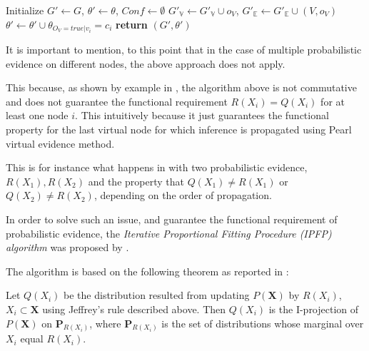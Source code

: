 \documentclass[11pt]{article}
\begin{document}
\begin{article}
\begin{algorithm*}[h!]
\begin{multicols}{2}
\begin{algorithmic}[1]
  \State Initialize $G'\leftarrow G$, $\theta'\leftarrow\theta$, $Conf \leftarrow \emptyset$
    
  \EndFor
    \State $G'_{\mathbb{V}}\leftarrow G'_{\mathbb{V}}\cup o_{V}$, $G'_{\mathbb{E}}\leftarrow G'_{\mathbb{E}}\cup(V,o_{V})$      
       
      \State $\theta'\leftarrow\theta'\cup\theta_{O_{V}=true|v_{i}}=c_{i}$ 
    \EndFor
  \EndFor
\State \textbf{return} $(G',\theta')$
\end{algorithmic}
\end{multicols}
\end{algorithm*}

It is important to mention, to this point that in the case of
multiple probabilistic evidence on different nodes, the above
approach does not apply.

This because, as shown by example in \cite{PENG_2010}, the algorithm
above is not commutative and does not guarantee the functional
requirement \(R(X_i) = Q(X_i)\) for at least one node \(i\). This
intuitively because it just guarantees the functional property for the last
virtual node for which inference is propagated using Pearl virtual
evidence method.

This is for instance what happens in \cite{PENG_2010} with two
probabilistic evidence, \(R(X_1), R(X_2)\) and the property that
\(Q(X_1) \neq R(X_1)\) or \(Q(X_2) \neq R(X_2)\), depending on the
order of propagation.

In order to solve such an issue, and guarantee the functional
requirement of probabilistic evidence, the \emph{Iterative Proportional
Fitting Procedure (IPFP) algorithm} was proposed by
\cite{Valtorta_2002}.

The algorithm is based on the following theorem as reported in
\cite{PENG_2010}:

\begin{theorem}\label{thm:two-I-projection}
Let $Q(X_i)$ be the distribution resulted from updating $P(\textbf{X})$ by $R(X_i)$,
$X_i \subset \textbf{X}$ using Jeffrey’s rule described above. Then $Q(X_i)$ is the I-projection of $P(\textbf{X})$ on
$\textbf{P}_{R(X_i)}$, where $\textbf{P}_{R(X_i)}$ is the set of distributions whose marginal over $X_i$ equal $R(X_i)$.
\end{theorem}


\end{article}
\end{document}
